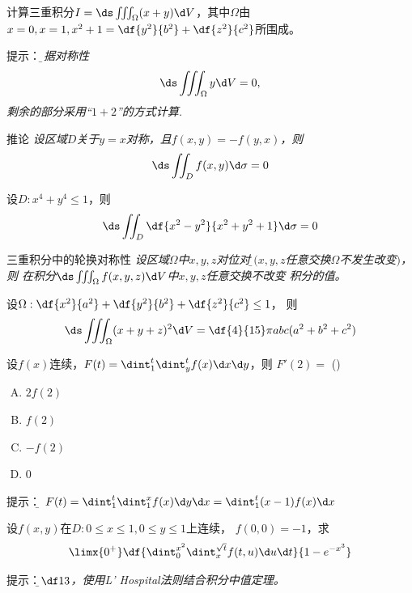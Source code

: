 \begin{frame}
	\linespread{1.5}
	计算三重积分$I=\ds\iiint_{\Omega}(x+y)\d V$，其中$\Omega$由
	$x=0,x=1,x^2+1=\df{y^2}{b^2}+\df{z^2}{c^2}$所围成。
	
	\pause\alert{提示：}{\it\b 根据对称性
	$$\ds\iiint_{\Omega}y\d V=0,$$
	剩余的部分采用“$1+2$”的方式计算.
	}
\end{frame}

\begin{frame}
	\linespread{1.5}
	\begin{block}{推论}
		{\it 设区域$D$关于$y=x$对称，且$f(x,y)=-f(y,x)$，则}
		$$\ds\iint_Df(x,y)\d\sigma=0$$
	\end{block}
	\bigskip\pause
	设$D:x^4+y^4\leq 1$，则
	$$\ds\iint_D\df{x^2-y^2}{x^2+y^2+1}\d\sigma=0$$
\end{frame}

\begin{frame}
	\linespread{1.5}
	\begin{exampleblock}{三重积分中的轮换对称性}
		{\it 设区域$\Omega$中$x,y,z$对位对等{\b $(x,y,z$任意交换$\Omega$不发生改变$)$}，则
		在积分$\ds\iiint_{\Omega}f(x,y,z)\d V$中$x,y,z$任意交换不改变
		积分的值。}
	\end{exampleblock}
	\bigskip\pause
	设$\Omega:\df{x^2}{a^2}+\df{y^2}{b^2}+\df{z^2}{c^2}\leq 1$，
	则
	$$\ds\iiint_{\Omega}(x+y+z)^2\d V=\df{4}{15}\pi abc(a^2+b^2+c^2)$$
\end{frame}


\begin{frame}
	\linespread{1.5}
	设$f(x)$连续，$F(t)=\dint_1^t\dint_y^tf(x)\d x\d y$，则
	$F'(2)=$
	(\underline{\;})
	\begin{enumerate}[(A)]
	  \item $2f(2)$
	  \item $f(2)$
	  \item $-f(2)$
	  \item $0$
	\end{enumerate}
	
	\pause\alert{提示：}{\it\b  
	$F(t)=\dint_1^t\dint_1^xf(x)\d y\d x=\dint_1^t(x-1)f(x)\d x$
	}
\end{frame}

\begin{frame}
	\linespread{2}
	设$f(x,y)$在$D:0\leq x\leq 1,0\leq y\leq 1$上连续，
	$f(0,0)=-1$，求
	$$\limx{0^+}\df{\dint_0^{x^2}\dint_x^{\sqrt t}f(t,u)\d u\d t}
	{1-e^{-x^3}}$$
	
	\pause\alert{提示：}{\it\b $\df13$，使用L' Hospital法则结合积分中值定理。
	}
\end{frame}

